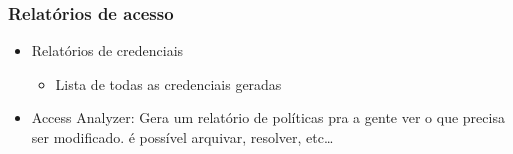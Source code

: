 \begin{frame}
	\frametitle{Relatórios de acesso}
	\begin{itemize}
		\item Relatórios de credenciais
			\begin{itemize}
				\item Lista de todas as credenciais geradas
			\end{itemize}
		\item Access Analyzer: Gera um relatório de políticas pra a gente ver o que precisa ser modificado. é possível arquivar, resolver, etc\dots
	\end{itemize}
\end{frame}

